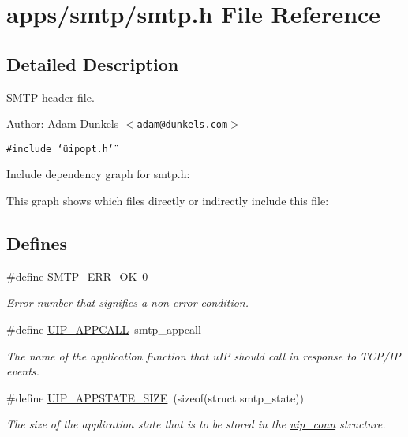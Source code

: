 \hypertarget{a00042}{
\section{apps/smtp/smtp.h File Reference}
\label{a00042}
}


\subsection{Detailed Description}
SMTP header file. 

\begin{Desc}
\item[Author:]Adam Dunkels $<$\href{mailto:adam@dunkels.com}{\tt adam@dunkels.com}$>$ \end{Desc}


{\tt \#include \char`\"{}uipopt.h\char`\"{}}\par


Include dependency graph for smtp.h:

This graph shows which files directly or indirectly include this file:\subsection*{Defines}
\begin{CompactItemize}
\item 
\hypertarget{a00080_g029256bc17a12e1e86781887e11c0c7d}{
\#define \hyperlink{a00080_g029256bc17a12e1e86781887e11c0c7d}{SMTP\_\-ERR\_\-OK}~0}
\label{a00080_g029256bc17a12e1e86781887e11c0c7d}

\begin{CompactList}\small\item\em Error number that signifies a non-error condition. \item\end{CompactList}\item 
\hypertarget{a00078_g41aa744caa46913b3b3aedb2a4e78546}{
\#define \hyperlink{a00078_g41aa744caa46913b3b3aedb2a4e78546}{UIP\_\-APPCALL}~smtp\_\-appcall}
\label{a00078_g41aa744caa46913b3b3aedb2a4e78546}

\begin{CompactList}\small\item\em The name of the application function that u\-IP should call in response to TCP/IP events. \item\end{CompactList}\item 
\hypertarget{a00078_g04e916653107663a756635a739fcef1b}{
\#define \hyperlink{a00078_g04e916653107663a756635a739fcef1b}{UIP\_\-APPSTATE\_\-SIZE}~(sizeof(struct smtp\_\-state))}
\label{a00078_g04e916653107663a756635a739fcef1b}

\begin{CompactList}\small\item\em The size of the application state that is to be stored in the \hyperlink{a00028}{uip\_\-conn} structure. \item\end{CompactList}\end{CompactItemize}
